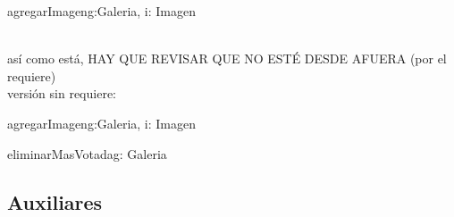 \documentclass[10pt,a4paper,spanish]{article}
\begin{document}
\begin{ejercicio}

	\begin{problema*}{agregarImagen}{g:Galeria, i: Imagen}
\end{problema*}
    \\
		así como está, HAY QUE REVISAR QUE NO ESTÉ DESDE AFUERA (por el requiere) \\
     versión sin requiere:

	\begin{problema*}{agregarImagen}{g:Galeria, i: Imagen}
	\end{problema*}

\end{ejercicio}

\begin{ejercicio}
\end{ejercicio}

\begin{ejercicio}
\end{ejercicio}

\begin{ejercicio}
\end{ejercicio}

\begin{ejercicio}

	\begin{problema*}{eliminarMasVotada}{g: Galeria}
		\modifica{g}
	\end{problema*}


\end{ejercicio}


\subsection{Auxiliares}
\end{document}
